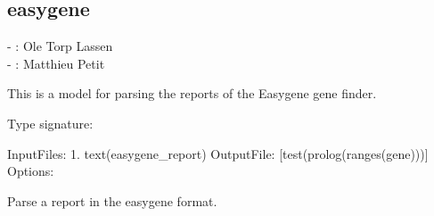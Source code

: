 


\subsection{easygene}

\label{sec:easygene}

\begin{tags}
- : Ole Torp Lassen \\- : Matthieu Petit
\end{tags}

This is a model for parsing the reports of the Easygene gene finder.\vspace{0.7cm}

\begin{description}
Type signature:

\begin{code}
InputFiles:
    1. text(easygene_report)
OutputFile:
    [test(prolog(ranges(gene)))]
Options:
\end{code}

Parse a report in the easygene format.
\end{description}

